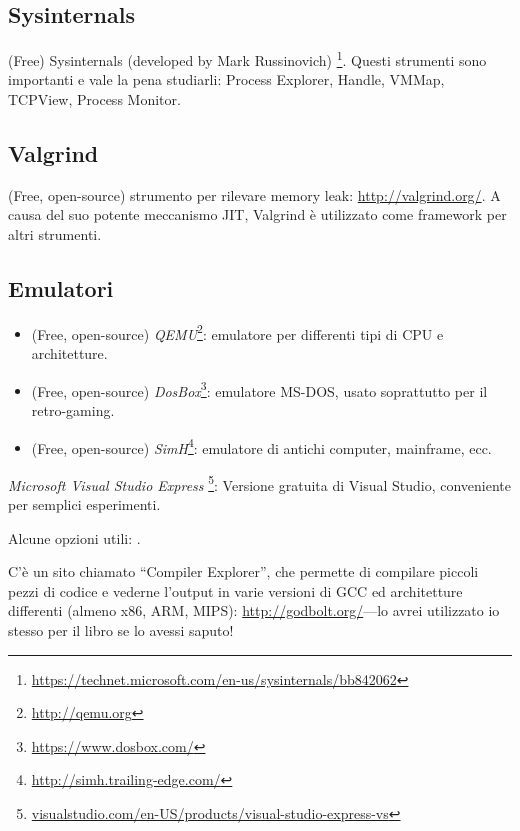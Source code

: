 \subsection{Sysinternals}

(Free) Sysinternals (developed by Mark Russinovich)
\footnote{\url{https://technet.microsoft.com/en-us/sysinternals/bb842062}}.
Questi strumenti sono importanti e vale la pena studiarli: Process Explorer, Handle, VMMap, TCPView, Process Monitor.

\subsection{Valgrind}

(Free, open-source) strumento per rilevare memory leak: \url{http://valgrind.org/}.
A causa del suo potente meccanismo \ac{JIT}, Valgrind è utilizzato come framework per altri strumenti.


\subsection{Emulatori}

\begin{itemize}
\item (Free, open-source) \emph{QEMU}\footnote{\url{http://qemu.org}}: emulatore per differenti tipi di CPU e architetture.

\item (Free, open-source) \emph{DosBox}\footnote{\url{https://www.dosbox.com/}}: emulatore MS-DOS, usato soprattutto per il retro-gaming.

\item (Free, open-source) \emph{SimH}\footnote{\url{http://simh.trailing-edge.com/}}: emulatore di antichi computer, mainframe, ecc.
\end{itemize}


\emph{Microsoft Visual Studio Express}
\footnote{\href{http://go.yurichev.com/17034}{visualstudio.com/en-US/products/visual-studio-express-vs}}:
Versione gratuita di Visual Studio, conveniente per semplici esperimenti.

Alcune opzioni utili: .

C'è un sito chiamato ``Compiler Explorer'', che permette di compilare piccoli pezzi di codice e vederne l'output
in varie versioni di GCC ed architetture differenti
(almeno x86, ARM, MIPS): \url{http://godbolt.org/}---lo avrei utilizzato io stesso per il libro se lo avessi saputo!

